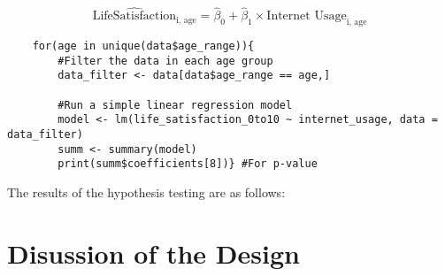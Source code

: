 \documentclass[12pt, a4paper]{article}
\begin{document}
$$\widehat{\text{LifeSatisfaction}}_{\text{i, age}} = \hat{\beta}_0 + \hat{\beta}_1 \times \text{Internet Usage}_{\text{i, age}}$$

\begin{verbatim}
    for(age in unique(data$age_range)){
        #Filter the data in each age group
        data_filter <- data[data$age_range == age,]

        #Run a simple linear regression model
        model <- lm(life_satisfaction_0to10 ~ internet_usage, data = data_filter)
        summ <- summary(model)
        print(summ$coefficients[8])} #For p-value   
\end{verbatim}

\par The results of the hypothesis testing are as follows:

\begin{table}[h]
\end{table}

\section{Disussion of the Design}
\end{document}
